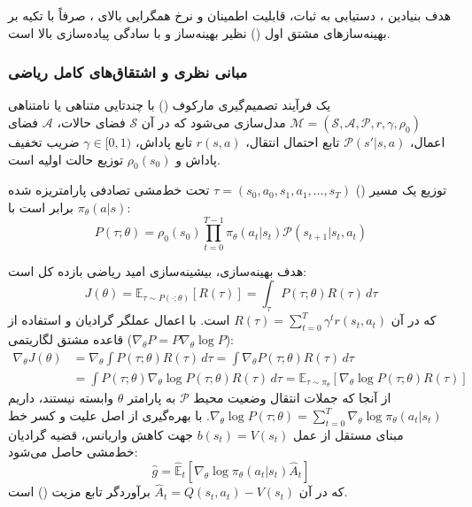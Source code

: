 هدف بنیادین ، دستیابی به ثبات، قابلیت اطمینان و نرخ همگرایی بالای ، صرفاً با تکیه بر بهینه‌سازهای مشتق اول () نظیر بهینه‌ساز  \cite{kingma2014adam} و با سادگی پیاده‌سازی بالا است.

\subsubsection*{مبانی نظری و اشتقاق‌های کامل ریاضی}

یک فرآیند تصمیم‌گیری مارکوف () با چندتایی متناهی یا نامتناهی $\mathcal{M} = (\mathcal{S}, \mathcal{A}, \mathcal{P}, r, \gamma, \rho_0)$ مدل‌سازی می‌شود که در آن $\mathcal{S}$ فضای حالات، $\mathcal{A}$ فضای اعمال، $\mathcal{P}(s'|s, a)$ تابع احتمال انتقال، $r(s, a)$ تابع پاداش، $\gamma \in [0, 1)$ ضریب تخفیف پاداش و $\rho_0(s_0)$ توزیع حالت اولیه است.

توزیع یک مسیر () $\tau = (s_0, a_0, s_1, a_1, \dots, s_T)$ تحت خط‌مشی تصادفی پارامتریزه شده $\pi_\theta(a|s)$ برابر است با:
\begin{equation}
	P(\tau; \theta) = \rho_0(s_0) \prod_{t=0}^{T-1} \pi_\theta(a_t | s_t) \mathcal{P}(s_{t+1} | s_t, a_t)
\end{equation}

هدف بهینه‌سازی، بیشینه‌سازی امید ریاضی بازده کل است:
\begin{equation}
	J(\theta) = \mathbb{E}_{\tau \sim P(\cdot; \theta)} [R(\tau)] = \int_{\tau} P(\tau; \theta) R(\tau) \, d\tau
\end{equation}
که در آن $R(\tau) = \sum_{t=0}^T \gamma^t r(s_t, a_t)$ است. با اعمال عملگر گرادیان و استفاده از قاعده مشتق لگاریتمی ($\nabla_\theta P = P \nabla_\theta \log P$):
\begin{align}
	\nabla_\theta J(\theta) &= \nabla_\theta \int P(\tau; \theta) R(\tau) \, d\tau = \int \nabla_\theta P(\tau; \theta) R(\tau) \, d\tau \nonumber \\
	&= \int P(\tau; \theta) \nabla_\theta \log P(\tau; \theta) R(\tau) \, d\tau = \mathbb{E}_{\tau \sim \pi_\theta} \left[ \nabla_\theta \log P(\tau; \theta) R(\tau) \right]
\end{align}
از آنجا که جملات انتقال وضعیت محیط $\mathcal{P}$ به پارامتر $\theta$ وابسته نیستند، داریم $\nabla_\theta \log P(\tau; \theta) = \sum_{t=0}^T \nabla_\theta \log \pi_\theta(a_t | s_t)$. با بهره‌گیری از اصل علیت و کسر خط مبنای مستقل از عمل $b(s_t) = V(s_t)$ جهت کاهش واریانس، قضیه گرادیان خط‌مشی حاصل می‌شود:
\begin{equation}
	\hat{g} = \hat{\mathbb{E}}_t \left[ \nabla_\theta \log \pi_\theta(a_t | s_t) \hat{A}_t \right]
\end{equation}
که در آن $\hat{A}_t = Q(s_t, a_t) - V(s_t)$ برآوردگر تابع مزیت () است.

